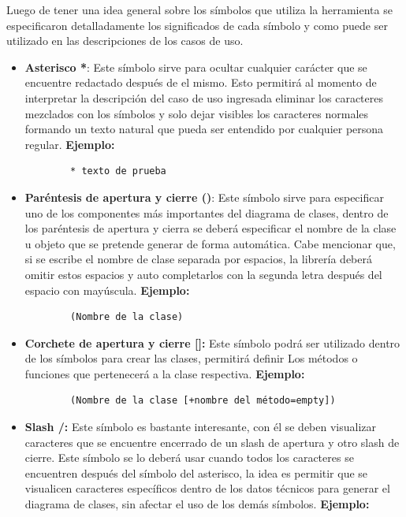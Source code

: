 Luego de tener una idea general sobre los símbolos que utiliza la herramienta se especificaron detalladamente los significados de cada símbolo y como puede ser utilizado en las descripciones de los casos de uso. 

\sloppy
\begin{itemize}
	\item \textbf{Asterisco *}: Este símbolo sirve para ocultar cualquier carácter que se encuentre redactado después de el mismo. Esto permitirá al momento de interpretar la descripción del caso de uso ingresada eliminar los caracteres mezclados con los símbolos y solo dejar visibles los caracteres normales formando un texto natural que pueda ser entendido por cualquier persona regular. \textbf{Ejemplo:}
	
	\begin{verbatim}
		* texto de prueba
	\end{verbatim}
	
	\item \textbf{Paréntesis de apertura y cierre ()}: Este símbolo sirve para especificar uno de los componentes más importantes del diagrama de clases, dentro de los paréntesis de apertura y cierra se deberá especificar el nombre de la clase u objeto que se pretende generar de forma automática. Cabe mencionar que, si se escribe el nombre de clase separada por espacios, la librería deberá omitir estos espacios y auto completarlos con la segunda letra después del espacio con mayúscula. \textbf{Ejemplo:}  
	
	\begin{verbatim}
		(Nombre de la clase)
	\end{verbatim}
	
	\item \textbf{Corchete de apertura y cierre []:} Este símbolo podrá ser utilizado dentro de los símbolos para crear las clases, permitirá definir Los métodos o funciones que pertenecerá a la clase respectiva. \textbf{Ejemplo:}
	
	\begin{verbatim}
		(Nombre de la clase [+nombre del método=empty])
	\end{verbatim} 
	
	\item \textbf{Slash /:} Este símbolo es bastante interesante, con él se deben visualizar  caracteres que se encuentre encerrado de un slash de apertura y otro slash de cierre. Este símbolo se lo deberá usar cuando todos los caracteres se encuentren después del símbolo del asterisco, la idea es permitir que se visualicen caracteres específicos dentro de los datos técnicos para generar el diagrama de clases, sin afectar el uso de los demás símbolos. \textbf{Ejemplo:}
	

\end{itemize}
